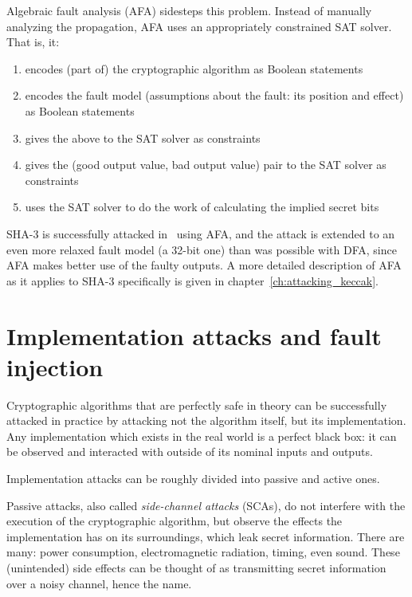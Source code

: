 \documentclass[times, utf8, diplomski]{fer}
\begin{document}
Algebraic fault analysis (AFA) sidesteps this problem. Instead of manually
analyzing the propagation, AFA uses an appropriately constrained SAT solver.
That is, it:
\begin{enumerate}
    \item encodes (part of) the cryptographic algorithm as Boolean statements
    \item encodes the fault model (assumptions about the fault: its position
          and effect) as Boolean statements
    \item gives the above to the SAT solver as constraints
    \item gives the (good output value, bad output value) pair to the SAT solver
          as constraints
    \item uses the SAT solver to do the work of calculating the implied secret
          bits
\end{enumerate}

SHA-3 is successfully attacked in~\cite{luo2018algebraic} using AFA, and the
attack is extended to an even more relaxed fault model (a 32-bit one) than
was possible with DFA, since AFA makes better use of the faulty outputs.
A more detailed description of AFA as it applies to SHA-3 specifically is
given in chapter~\ref{ch:attacking_keccak}.


\section{Implementation attacks and fault injection}
Cryptographic algorithms that are perfectly safe in theory can be successfully
attacked in practice by attacking not the algorithm itself, but its implementation.
Any implementation which exists in the real world is a perfect black box: it can
be observed and interacted with outside of its nominal inputs and outputs.

Implementation attacks can be roughly divided into passive and active ones.

Passive attacks, also called \emph{side-channel attacks} (SCAs), do not interfere
with the execution of the cryptographic algorithm, but observe the effects the
implementation has on its surroundings, which leak secret information.
There are many: power consumption, electromagnetic radiation, timing, even sound. %
These (unintended) side effects can be thought of as transmitting secret
information over a noisy channel, hence the name.
\end{document}
